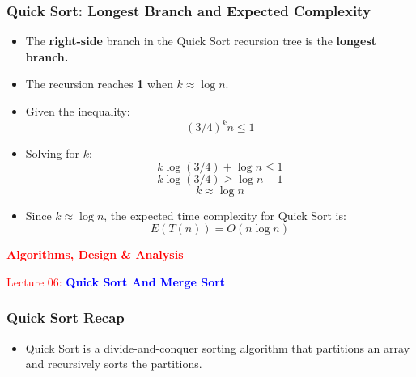 \begin{frame}
    \frametitle{Quick Sort: Longest Branch and Expected Complexity}
    
    \begin{itemize}
        \item The \textbf{right-side} branch in the Quick Sort recursion tree is the \textbf{longest branch.}
        \item The recursion reaches \textbf{1} when \( k \approx \log n \).
        \item Given the inequality:
        \[
        (3/4)^kn \leq 1
        \]
        \item Solving for \( k \):
        \[
        k \log(3/4) + \log n \leq 1
        \]
        \[
        k \log(3/4) \geq \log n - 1
        \]
        \[
        k \approx \log n
        \]
        \item Since \( k \approx \log n \), the expected time complexity for Quick Sort is:
        \[
        E(T(n)) = O(n \log n)
        \]
    \end{itemize}

\end{frame}




\begin{frame}
    \begin{center}
        \vspace*{1cm}  %
        {\Large \textcolor{red}{\textbf{Algorithms, Design \& Analysis}}}
        
        \vspace{0.5cm}  %
        {\textcolor{red}{\large Lecture 06: }\textcolor{blue}{\textbf{Quick Sort And Merge Sort}}}
        
        \vspace{1cm}  %
    \end{center}
\end{frame}






\begin{frame}
    \frametitle{Quick Sort Recap}
    \begin{itemize}
        \item Quick Sort is a divide-and-conquer sorting algorithm that partitions an array and recursively sorts the partitions.
    \end{itemize}
\end{frame}


